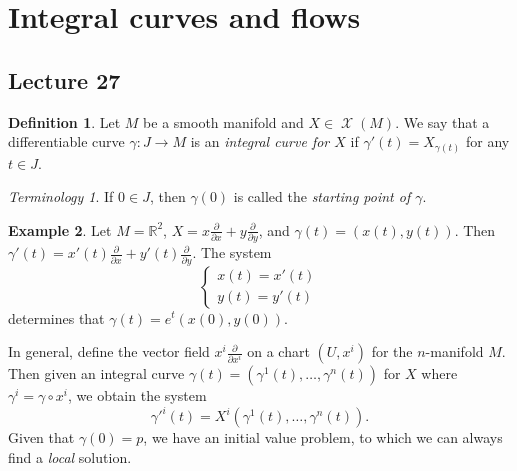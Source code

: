 \documentclass[10pt,letterpaper,cm]{nupset}
\theoremstyle{definition}
\newtheorem{definition}{Definition}[subsection]
\newtheorem{exmp}[definition]{Example}
\theoremstyle{theorem}
\theoremstyle{remark}
\newtheorem*{term}{Terminology}
\newcommand{\R}{\mathbb R}
\newcommand{\1}{\mathbf{1}}
\newcommand{\0}{\vec 0}
\DeclareMathOperator{\vf}{\mathscr{X}}
\begin{document}
\section{Integral curves and flows}

\subsection{Lecture 27}

\begin{definition}
Let $M$ be a smooth manifold and $X\in \vf(M)$. We say that a differentiable curve $\gamma : J \to M$ is an \textit{integral curve for $X$} if $\gamma'(t) = X_{\gamma(t)}$ for any $t\in J$.
\end{definition}

\begin{term}
If $0\in J$, then $\gamma(0)$ is called the \textit{starting point of $\gamma$}.
\end{term}

\begin{exmp}
Let $M= \R^2$, $X = x\frac{\partial}{\partial{x}} + y \frac{\partial}{\partial{y}}$, and $\gamma(t) = \left(x(t), y(t)\right)$. Then $\gamma'(t) = x'(t)\frac{\partial}{\partial{x}}  + y'(t)\frac{\partial}{\partial{y}}$.  The system 
\[
\begin{cases} x(t) = x'(t) \\ y(t) = y'(t) \end{cases}
\] determines that 
$\gamma(t) = e^t(x(0), y(0))$.
\end{exmp}

\medskip


In general, define the vector field $x^i\frac{\partial}{\partial{x^i}}$ on a chart $\left(U, x^i\right)$ for the $n$-manifold $M$. Then given an integral curve $\gamma(t) = \left(\gamma^1(t), \ldots, \gamma^n(t)\right)$ for $X$ where $\gamma^i = \gamma \circ x^i$, we obtain the system $$ \gamma'^i(t) = X^i\left(\gamma^1(t), \ldots, \gamma^n(t)\right).  $$ Given that $\gamma(0) =p$, we have an initial value problem, to which we can always find a \emph{local} solution.

\smallskip
\end{document}
